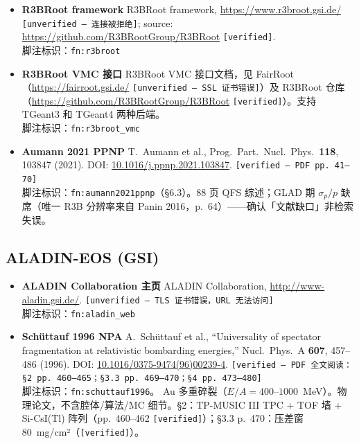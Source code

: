 \documentclass[a4paper, 11pt]{article}
\begin{document}
\begin{itemize}[leftmargin=2em,itemsep=3pt]
\item \textbf{R3BRoot framework} \quad
R3BRoot framework, \url{https://www.r3broot.gsi.de/} \texttt{[unverified --- 连接被拒绝]};
source: \url{https://github.com/R3BRootGroup/R3BRoot} \texttt{[verified]}.
\\
脚注标识：\texttt{fn:r3broot}

\item \textbf{R3BRoot VMC 接口} \quad
R3BRoot VMC 接口文档，见 FairRoot（\url{https://fairroot.gsi.de/} \texttt{[unverified --- SSL 证书错误]}）及 R3BRoot 仓库（\url{https://github.com/R3BRootGroup/R3BRoot} \texttt{[verified]}）。支持 TGeant3 和 TGeant4 两种后端。
\\
脚注标识：\texttt{fn:r3broot\_vmc}

\item \textbf{Aumann 2021 PPNP} \quad
T.~Aumann et al., Prog.\ Part.\ Nucl.\ Phys.\ \textbf{118}, 103847 (2021).
DOI: \href{https://doi.org/10.1016/j.ppnp.2021.103847}{10.1016/j.ppnp.2021.103847}.
\texttt{[verified --- PDF pp.~41--70]}
\\
脚注标识：\texttt{fn:aumann2021ppnp}（§6.3）。88 页 QFS 综述；GLAD 期 $\sigma_p/p$ 缺席（唯一 R3B 分辨率来自 Panin 2016，p.~64）——确认「文献缺口」非检索失误。

\end{itemize}

\subsection{ALADIN-EOS (GSI)}

\begin{itemize}[leftmargin=2em,itemsep=3pt]

\item \textbf{ALADIN Collaboration 主页} \quad
ALADIN Collaboration, \url{http://www-aladin.gsi.de/}.
\texttt{[unverified --- TLS 证书错误，URL 无法访问]}
\\
脚注标识：\texttt{fn:aladin\_web}

\item \textbf{Schüttauf 1996 NPA} \quad
A.~Schüttauf et al., ``Universality of spectator fragmentation at relativistic bombarding energies,''
Nucl.\ Phys.\ A \textbf{607}, 457--486 (1996).
DOI: \href{https://doi.org/10.1016/0375-9474(96)00239-4}{10.1016/0375-9474(96)00239-4}.
\texttt{[verified --- PDF 全文阅读：§2 pp.~460--465；§3.3 pp.~469--470；§4 pp.~473--480]}
\\
脚注标识：\texttt{fn:schuttauf1996}。
Au 多重碎裂（$E/A=400$--$1000$~MeV）。物理论文，不含腔体/算法/MC 细节。§2：TP-MUSIC III TPC + TOF 墙 + Si-CsI(Tl) 阵列（pp.~460--462 \texttt{[verified]}）；§3.3 p.~470：压差窗 80~mg/cm²（\texttt{[verified]}）。

\end{itemize}
\end{document}
